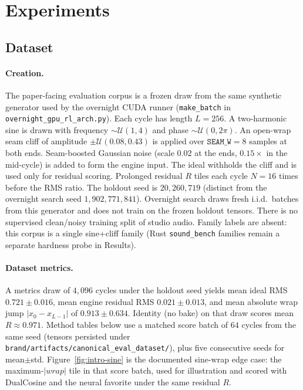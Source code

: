 \section{Experiments}
\label{sec:experiments}

\subsection{Dataset}
\label{sec:dataset}

\paragraph{Creation.}
The paper-facing evaluation corpus is a frozen draw from the same synthetic generator used by the overnight CUDA runner (\texttt{make\_batch} in \texttt{overnight\_gpu\_rl\_arch.py}).
Each cycle has length $L{=}256$.
A two-harmonic sine is drawn with frequency $\sim\mathcal{U}(1,4)$ and phase $\sim\mathcal{U}(0,2\pi)$.
An open-wrap seam cliff of amplitude $\pm\mathcal{U}(0.08,0.43)$ is applied over $\texttt{SEAM\_W}{=}8$ samples at both ends.
Seam-boosted Gaussian noise (scale $0.02$ at the ends, $0.15\times$ in the mid-cycle) is added to form the engine input.
The ideal withholds the cliff and is used only for residual scoring.
Prolonged residual $R$ tiles each cycle $N{=}16$ times before the RMS ratio.
The holdout seed is $20{,}260{,}719$ (distinct from the overnight search seed $1{,}902{,}771{,}841$).
Overnight search draws fresh i.i.d.\ batches from this generator and does not train on the frozen holdout tensors.
There is no supervised clean/noisy training split of studio audio.
Family labels are absent: this corpus is a single sine{+}cliff family (Rust \texttt{sound\_bench} families remain a separate hardness probe in Results).

\paragraph{Dataset metrics.}
A metrics draw of $4{,}096$ cycles under the holdout seed yields mean ideal RMS $0.721\pm0.016$, mean engine residual RMS $0.021\pm0.013$, and mean absolute wrap jump $|x_0-x_{L-1}|$ of $0.913\pm0.634$.
Identity (no bake) on that draw scores mean $R\approx0.971$.
Method tables below use a matched score batch of $64$ cycles from the same seed (tensors persisted under \texttt{brand/artifacts/canonical\_eval\_dataset/}), plus five consecutive seeds for mean$\pm$std.
Figure~\ref{fig:intro-sine} is the documented sine-wrap edge case: the maximum-$|wrap|$ tile in that score batch, used for illustration and scored with DualCosine and the neural favorite under the same residual $R$.

